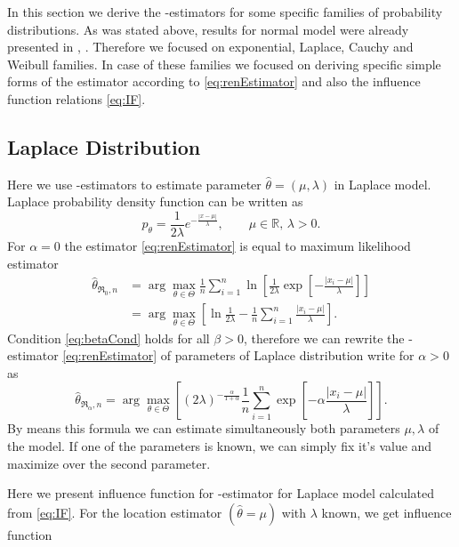 
In this section we derive the \mRa-estimators for some specific families of probability distributions. As was stated above, results for normal model were already presented in  \cite{Vajda2009}, \cite{Demut2010}. Therefore we focused on exponential, Laplace, Cauchy and Weibull families. In case of these families we focused on deriving specific simple forms of the estimator according to \eqref{eq:renEstimator} and also the influence function relations \eqref{eq:IF}.

\subsection{Laplace Distribution} 
Here we use \mRa-estimators to estimate parameter $\hat{\theta} = (\mu,\lambda)$ in Laplace model. Laplace probability density function can be written as 
\begin{equation}
	p_\theta = \frac{1}{2\lambda} e^{-\frac{|x-\mu|}{\lambda}}, \qquad \mu\in \mathbb{R},\, \lambda>0.
\end{equation}
For $\alpha = 0$ the estimator \eqref{eq:renEstimator} is equal to maximum likelihood estimator
\begin{align}
	\hat{\theta}_{\mathfrak{R}_0,n} & = \arg \max_{\theta \in \Theta} \frac{1}{n} \sum^n_{i=1} \ln \left[ \frac{1}{2\lambda}\exp \left[-\frac{|x_i-\mu|}{\lambda} \right] \right] \nonumber \\
	& =  \arg \max_{\theta \in \Theta} \left[ \ln \frac{1}{2\lambda} - \frac{1}{n} \sum^n_{i=1} \frac{|x_i-\mu|}{\lambda} \right].
\end{align}
Condition \eqref{eq:betaCond} holds for all $\beta>0$, therefore we can rewrite the \mRa-estimator \eqref{eq:renEstimator} of parameters of Laplace distribution write for $\alpha>0$ as
\begin{equation}
	\hat{\theta}_{\mathfrak{R}_\alpha,n} = \arg \max_{\theta \in \Theta} \left[ (2\lambda)^{-\frac{\alpha}{1+\alpha}} \frac{1}{n} \sum_{i=1}^n \exp \left[-\alpha\frac{|x_i-\mu|}{\lambda} \right] \right].
	\label{renyi-formula-laplace}
\end{equation}
By means this formula we can estimate simultaneously both parameters $\mu, \lambda$ of the model. If one of the parameters is known, we can simply fix it's value and maximize over the second parameter.

Here we present influence function for \mRa-estimator for Laplace model calculated from \eqref{eq:IF}. For the location estimator $(\hat{\theta} = \mu)$ with $\lambda$ known, we get influence function

